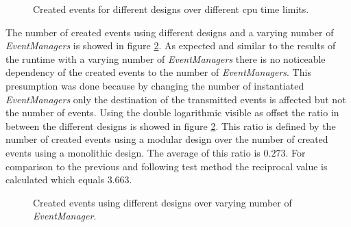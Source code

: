 \begin{figure}
    \centering
    \caption{Created events for different designs over different cpu time limits.}
    \label{fig:results_event_cpu_time}
\end{figure}

The number of created events using different designs and a varying number of \emph{EventManagers} is showed in figure \ref{fig:results_event_eventmanager}.
As expected and similar to the results of the runtime with a varying number of \emph{EventManagers} there is no noticeable dependency of the created events to the number of \emph{EventManagers}.
This presumption was done because by changing the number of instantiated \emph{EventManagers} only the destination of the transmitted events is affected but not the number of events.
Using the double logarithmic visible as offset the ratio in between the different designs is showed in figure \ref{fig:results_event_eventmanager}.
This ratio is defined by the number of created events using a modular design over the number of created events using a monolithic design.
The average of this ratio is $0.273$.
For comparison to the previous and following test method the reciprocal value is calculated which equals $3.663$.
\\

\begin{figure}
    \centering
    \caption{Created events using different designs over varying number of \emph{EventManager}.}
    \label{fig:results_event_eventmanager}
\end{figure}

